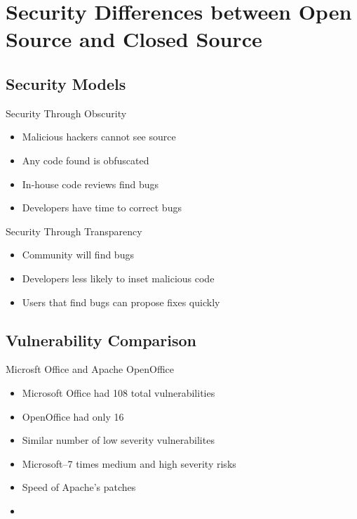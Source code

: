 \section{Security Differences between Open Source and Closed Source}\frame{\sectionpage}

\subsection{Security Models}
\begin{frame}{Security Through Obscurity}
  \begin{itemize}
    \item Malicious hackers cannot see source
    \item Any code found is obfuscated
    \item In-house code reviews find bugs
    \item Developers have time to correct bugs
  \end{itemize}
\end{frame}

\begin{frame}{Security Through Transparency}
  \begin{itemize}
    \item Community will find bugs
    \item Developers less likely to inset malicious code
    \item Users that find bugs can propose fixes quickly
  \end{itemize}
\end{frame}

\subsection{Vulnerability Comparison}
\begin{frame}{Microsft Office and Apache OpenOffice}
  \begin{itemize}
    \item Microsoft Office had 108 total vulnerabilities
    \item OpenOffice had only 16
    \item Similar number of low severity vulnerabilites
    \item Microsoft--7 times medium and high severity risks
    \item Speed of Apache's patches
    \item\cite{kadura}
  \end{itemize}
\end{frame}

